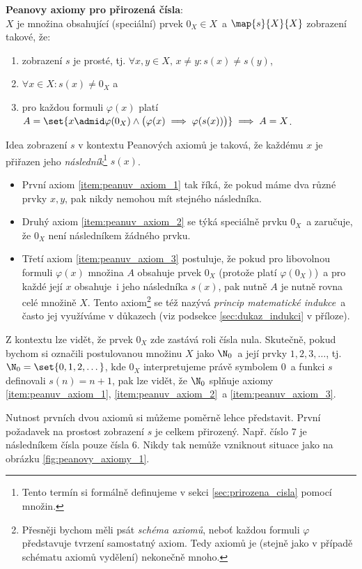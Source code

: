 \noindent\textbf{Peanovy axiomy pro přirozená čísla}:\\
$X$ je množina obsahující (speciální) prvek $0_X\in X$~a $\map{s}{X}{X}$ zobrazení takové, že:
\begin{enumerate}[label=({P}\arabic*)]
    \item\label{item:peanuv_axiom_1} zobrazení $s$ je prosté, tj. $\forall x,y\in X,\,x\neq y: s(x)\neq s(y)$,
    \item\label{item:peanuv_axiom_2} $\forall x\in X: s(x)\neq 0_X$ a
    \item\label{item:peanuv_axiom_3} pro každou formuli $\varphi(x)$ platí $A=\set{x \admid \varphi(0_X) \land \big(\varphi(x)\implies \varphi(s(x))\big)}\implies A=X$.
\end{enumerate}
Idea zobrazení $s$ v kontextu Peanových axiomů je taková, že každému $x$ je přiřazen jeho \emph{následník}\footnote{Tento termín si formálně definujeme v sekci \ref{sec:prirozena_cisla} pomocí množin.} $s(x)$.
\begin{itemize}
    \item První axiom \ref{item:peanuv_axiom_1} tak říká, že pokud máme dva různé prvky $x,y$, pak nikdy nemohou mít stejného následníka.
    \item Druhý axiom \ref{item:peanuv_axiom_2} se týká speciálně prvku $0_X$~a zaručuje, že $0_X$ není následníkem žádného prvku.
    \item Třetí axiom \ref{item:peanuv_axiom_3} postuluje, že pokud pro libovolnou formuli $\varphi(x)$ množina $A$ obsahuje prvek $0_X$ (protože platí $\varphi(0_X)$)~a pro každé její $x$ obsahuje~i jeho následníka $s(x)$, pak nutně $A$ je nutně rovna celé množině $X$. Tento axiom\footnote{Přesněji bychom měli psát \emph{schéma axiomů}, neboť každou formuli $\varphi$ představuje tvrzení samostatný axiom. Tedy axiomů je (stejně jako v případě schématu axiomů vydělení) nekonečně mnoho.} se též nazývá \emph{princip matematické indukce}~a často jej využíváme v důkazech (viz podsekce \ref{sec:dukaz_indukci} v příloze).
\end{itemize}
Z kontextu lze vidět, že prvek $0_X$ zde zastává roli čísla nula. Skutečně, pokud bychom si označili postulovanou množinu $X$ jako $\N_0$~a její prvky $1,2,3,\dots$, tj. $\N_0=\set{0,1,2,\dots}$, kde $0_X$ interpretujeme právě symbolem $0$~a funkci $s$ definovali $s(n)=n+1$, pak lze vidět, že $\N_0$ splňuje axiomy \ref{item:peanuv_axiom_1}, \ref{item:peanuv_axiom_2}~a \ref{item:peanuv_axiom_3}.\par
Nutnost prvních dvou axiomů si můžeme poměrně lehce představit. První požadavek na prostost zobrazení $s$ je celkem přirozený. Např. číslo $7$ je následníkem čísla pouze čísla $6$. Nikdy tak nemůže vzniknout situace jako na obrázku \ref{fig:peanovy_axiomy_1}.
